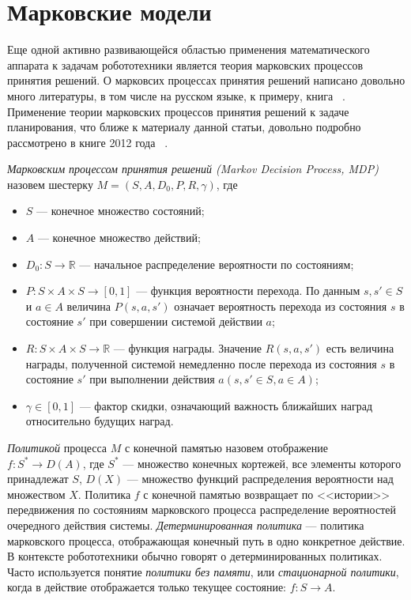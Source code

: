 \documentclass[a4, 14pt]{article}
\begin{document}
\section{Марковские модели}
Еще одной активно развивающейся областью применения математического 
аппарата к задачам робототехники является теория марковских процессов принятия 
решений. О марковсих процессах принятия решений написано довольно много литературы, 
в том  числе на русском языке, к примеру, книга ~\cite{main1977markov}. Применение
теории марковских процессов принятия решений к задаче планирования, что ближе к материалу 
данной статьи, довольно подробно рассмотрено в книге 2012 года ~\cite{kolobov2012planning}.

\textit{Марковским процессом принятия решений (Markov Decision Process, MDP)} 
назовем шестерку $M = (S, A, D_0, P, R, \gamma)$, где
\begin{itemize}
  \item $S$ --- конечное множество состояний;
  \item $A$ --- конечное множество действий;
  \item $D_0: S\rightarrow\mathbb{R}$ --- начальное распределение вероятности по состояниям;
  \item $P: S\times{A}\times{S}\rightarrow[0,1]$ --- функция вероятности перехода. 
    По данным $s, s' \in S$ и $a \in A$ величина $P(s,a,s')$ означает вероятность 
    перехода из состояния $s$ в состояние $s'$ при совершении системой действии $a$;
  \item $R: S\times{A}\times{S}\rightarrow\mathbb{R}$ --- функция награды. Значение 
    $R(s,a,s')$ есть величина награды, полученной системой немедленно после 
    перехода из состояния $s$ в состояние $s'$ при выполнении действия 
    $a (s,s' \in S, a \in A)$;
  \item $\gamma \in [0,1]$ --- фактор скидки, означающий важность ближайших 
    наград относительно будущих наград.
\end{itemize}

\textit{Политикой} процесса $M$ с конечной памятью назовем отображение $f: S^*\rightarrow{D}(A)$, 
где  $S^*$ --- множество конечных кортежей, все элементы которого принадлежат $S$, 
$D(X)$ --- множество функций распределения вероятности над множеством $X$. 
Политика $f$ с конечной памятью возвращает по <<истории>> передвижения по состояниям марковского 
процесса распределение вероятностей очередного действия системы. 
\textit{Детерминированная политика} --- политика марковского процесса, отображающая 
конечный путь в одно конкретное действие. В контексте робототехники обычно говорят
о детерминированных политиках. Часто используется понятие \textit{политики без памяти}, или
\textit{стационарной политики}, когда в действие отображается только текущее состояние: $f: S\rightarrow{A}$.
\end{document}
